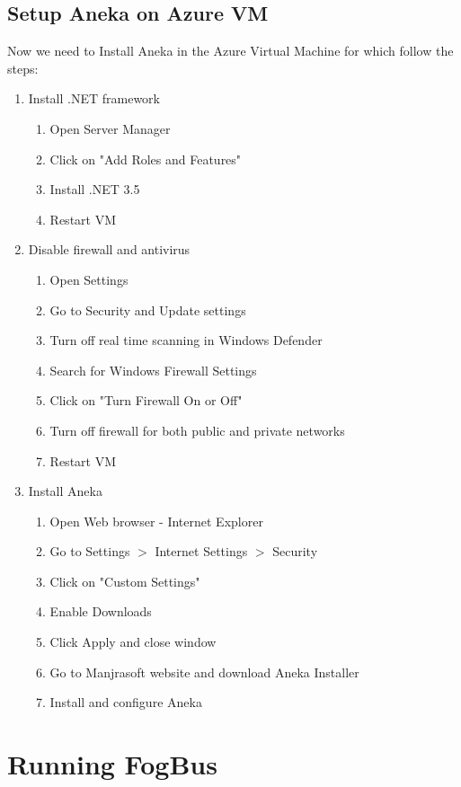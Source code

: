 \documentclass{article}
\begin{document}
\subsection{Setup Aneka on Azure VM}
Now we need to Install Aneka in the Azure Virtual Machine for which follow the steps:
\begin{enumerate}
\item Install .NET framework
\begin{enumerate}
\item Open Server Manager
\item Click on "Add Roles and Features"
\item Install .NET 3.5
\item Restart VM
\end{enumerate}
\item Disable firewall and antivirus 
\begin{enumerate}
\item Open Settings
\item Go to Security and Update settings
\item Turn off real time scanning in Windows Defender
\item Search for Windows Firewall Settings
\item Click on "Turn Firewall On or Off"
\item Turn off firewall for both public and private networks
\item Restart VM
\end{enumerate}
\item Install Aneka
\begin{enumerate}
\item Open Web browser - Internet Explorer
\item Go to Settings $>$ Internet Settings $>$ Security
\item Click on "Custom Settings"
\item Enable Downloads
\item Click Apply and close window
\item Go to Manjrasoft website and download Aneka Installer
\item Install and configure Aneka
\end{enumerate}
\end{enumerate}

\newpage

\section{Running FogBus}
\end{document}
